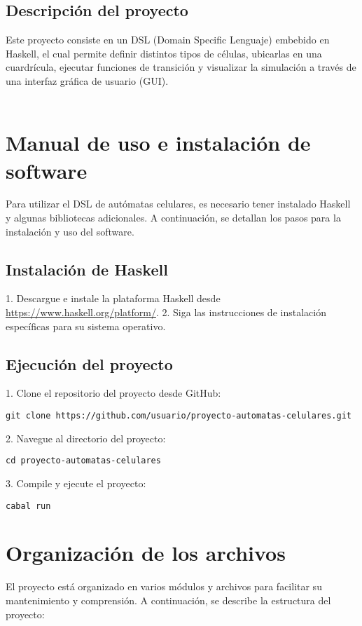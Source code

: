 \documentclass[a4paper,11pt]{article}
\theoremstyle{mytheor}
\begin{document}
 \subsection{Descripción del proyecto}
Este proyecto consiste en un DSL (Domain Specific Lenguaje) embebido en Haskell, el cual permite definir distintos tipos de células, ubicarlas en una cuardrícula, ejecutar funciones de transición y visualizar la simulación a través de una interfaz gráfica de usuario (GUI). \\
\\
\section{Manual de uso e instalación de software}
Para utilizar el DSL de autómatas celulares, es necesario tener instalado Haskell y algunas bibliotecas adicionales. A continuación, se detallan los pasos para la instalación y uso del software.

\subsection{Instalación de Haskell}
1. Descargue e instale la plataforma Haskell desde \url{https://www.haskell.org/platform/}.
2. Siga las instrucciones de instalación específicas para su sistema operativo.

\subsection{Ejecución del proyecto}
1. Clone el repositorio del proyecto desde GitHub:
\begin{verbatim}
git clone https://github.com/usuario/proyecto-automatas-celulares.git
\end{verbatim}
2. Navegue al directorio del proyecto:
\begin{verbatim}
cd proyecto-automatas-celulares
\end{verbatim}
3. Compile y ejecute el proyecto:
\begin{verbatim}
cabal run
\end{verbatim}

\section{Organización de los archivos}
El proyecto está organizado en varios módulos y archivos para facilitar su mantenimiento y comprensión. A continuación, se describe la estructura del proyecto:
\end{document}
